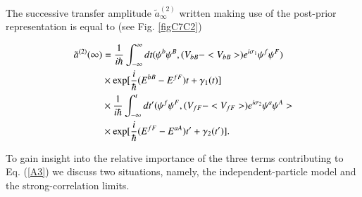 The successive transfer amplitude  $\tilde a^{(2)}_{\infty}$ written making use of the post-prior representation is equal to 
(see Fig. \ref{figC7C2})

\begin{align}\label{eqC7C7}
\nonumber \tilde a^{(2)} (\infty) & = \frac{1}{i \hbar} \int^{\infty}_{-\infty} dt (\psi^b \psi^B, (V_{bB} - <V_{bB}>) e^{i \sigma_1} \psi^f \psi^F )\\
 \nonumber &\times {\rm exp} [\frac{i}{\hbar} (E^{bB} - E^{fF}) t + \gamma_1(t)]   \\
\nonumber &\times \frac{1}{i \hbar} \int^{t}_{-\infty} dt' (\psi^f \psi^F, (V_{fF} - <V_{fF}>) e^{i \sigma_2} \psi^a \psi^A > \\
&\times {\rm exp} [\frac{i}{\hbar} (E^{fF} - E^{aA}) t' + \gamma_2(t')].
\end{align}

To gain insight into the  relative importance of the three terms contributing to Eq. (\ref{A3}) we discuss two situations, namely,
the independent-particle model and the strong-correlation limits. 


